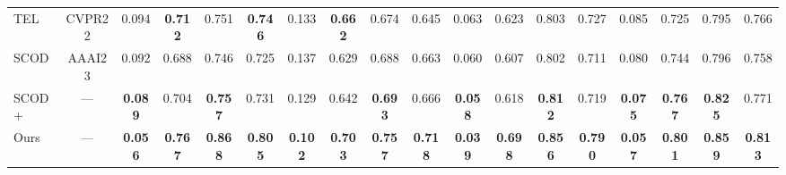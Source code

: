 \begin{table}[t]
{\begin{tabular}{l|c|cccc|cccc|cccc|cccc}
TEL~\cite{liang2022tree}                                           & CVPR22                                             & 0.094                                 & {\color[HTML]{00B0F0} \textbf{0.712}}                                 & 0.751                                 & {\color[HTML]{00B0F0} \textbf{0.746}}                                 & 0.133                                 & {\color[HTML]{00B0F0} \textbf{0.662}}                                 & 0.674                                 & 0.645                                 & 0.063                                 & 0.623                                 & 0.803                                 & 0.727                                 & 0.085                                 & 0.725                                 & 0.795                                 & 0.766                                 \\
SCOD~\cite{he2022weakly}                                         & AAAI23                                             & 0.092 & 0.688                                 & 0.746                                 & 0.725                                 & 0.137                                 & 0.629                                 & 0.688                                 & 0.663                                 & 0.060                                 & 0.607                                 & 0.802                                 & 0.711                                 & 0.080                                 & 0.744                                 & 0.796                                 & 0.758                                 \\
\rowcolor{c2!20} SCOD+ & \multicolumn{1}{c|}{---}& {\color[HTML]{00B0F0} \textbf{0.089}} & 0.704 & {\color[HTML]{00B0F0} \textbf{0.757}} & 0.731 & 0.129 & 0.642  & {\color[HTML]{00B0F0} \textbf{0.693}}  & 0.666 & {\color[HTML]{00B0F0} \textbf{0.058}} & 0.618 & {\color[HTML]{00B0F0} \textbf{0.812}} & 0.719 & {\color[HTML]{00B0F0} \textbf{0.075}} & {\color[HTML]{00B0F0} \textbf{0.767}} & {\color[HTML]{00B0F0} \textbf{0.825}} & 0.771      \\
\rowcolor{c2!20}Ours & \multicolumn{1}{c|}{---} & {\color[HTML]{FF0000} \textbf{0.056}} & {\color[HTML]{FF0000} \textbf{0.767}} & {\color[HTML]{FF0000} \textbf{0.868}} & {\color[HTML]{FF0000} \textbf{0.805}} & {\color[HTML]{FF0000} \textbf{0.102}} & {\color[HTML]{FF0000} \textbf{0.703}} & {\color[HTML]{FF0000} \textbf{0.757}} & {\color[HTML]{FF0000} \textbf{0.718}} & {\color[HTML]{FF0000} \textbf{0.039}} & {\color[HTML]{FF0000} \textbf{0.698}} & {\color[HTML]{FF0000} \textbf{0.856}} & {\color[HTML]{FF0000} \textbf{0.790}} & {\color[HTML]{FF0000} \textbf{0.057}} & {\color[HTML]{FF0000} \textbf{0.801}} & {\color[HTML]{FF0000} \textbf{0.859}} & {\color[HTML]{FF0000} \textbf{0.813}} \\ 
\bottomrule
\end{tabular}}
\label{table:CODQuanti}
\vspace{-0.5cm}
\end{table}

